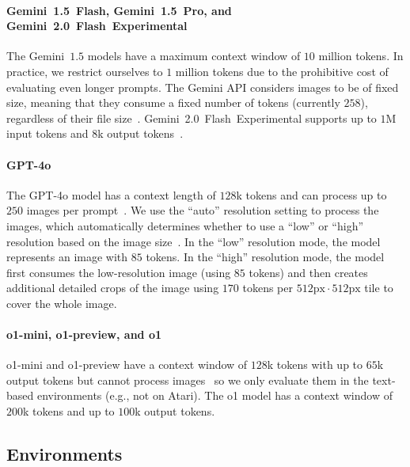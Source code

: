 \documentclass{article}
\newcommand{\eg}{e.g., }
\newcommand{\expflash}{Gemini~2.0~Flash~Experimental}
\newcommand{\flash}{Gemini~1.5~Flash}
\newcommand{\pro}{Gemini~1.5~Pro}
\newcommand{\gpt}{GPT-4o}
\newcommand{\mini}{o1-mini}
\newcommand{\preview}{o1-preview}
\newcommand{\oone}{o1}
\begin{document}
\paragraph{\flash{}, \pro{}, and \expflash{}}
The Gemini~$1.5$ models have a maximum context window of $10$ million tokens.
In practice, we restrict ourselves to $1$ million tokens due to the prohibitive cost of evaluating even longer prompts.
The Gemini API considers images to be of fixed size, meaning that they consume a fixed number of tokens (currently $258$), regardless of their file size~\citep{google2024understand}.
\expflash{} supports up to $1$M input tokens and $8$k output tokens~\citep{google2024flash}.
\paragraph{\gpt{}}
The \gpt{} model has a context length of $128$k tokens and can process up to $250$ images per prompt~\citep{openai2024models}.
We use the ``auto'' resolution setting to process the images, which automatically determines whether to use a ``low'' or ``high'' resolution based on the image size~\citep{openai2024vision}.
In the ``low'' resolution mode, the model represents an image with $85$ tokens.
In the ``high'' resolution mode, the model first consumes the low-resolution image (using $85$ tokens) and then creates additional detailed crops of the image using $170$ tokens per $512\mathrm{px} \cdot 512\mathrm{px}$ tile to cover the whole image.
\paragraph{\mini{}, \preview{}, and \oone{}}
\mini{} and \preview{} have a context window of $128$k tokens with up to $65$k output tokens but cannot process images~\citep{openai2024reasoning} so we only evaluate them in the text-based environments (\eg not on Atari).
The \oone{} model has a context window of $200$k tokens and up to $100$k output tokens.
\subsection{Environments}
\label{app:experimental-details:environments}
\end{document}
